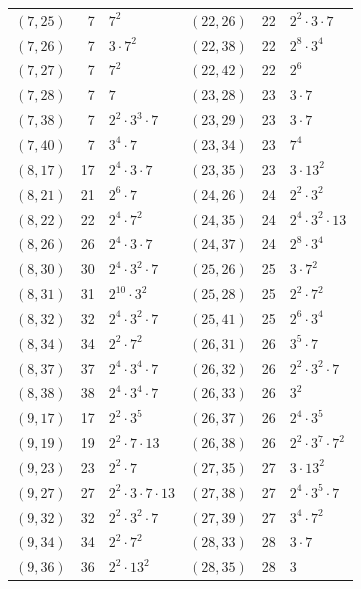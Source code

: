 \documentclass[11pt]{article}
\begin{document}
\begin{longtable}{@{}lrl@{\qquad}lrl@{}}
$(7,25)$ & 7 & $7^{2}$ & $(22,26)$ & 22 & $2^{2}\cdot 3\cdot 7$\\
$(7,26)$ & 7 & $3\cdot 7^{2}$ & $(22,38)$ & 22 & $2^{8}\cdot 3^{4}$\\
$(7,27)$ & 7 & $7^{2}$ & $(22,42)$ & 22 & $2^{6}$\\
$(7,28)$ & 7 & $7$ & $(23,28)$ & 23 & $3\cdot 7$\\
$(7,38)$ & 7 & $2^{2}\cdot 3^{3}\cdot 7$ & $(23,29)$ & 23 & $3\cdot 7$\\
$(7,40)$ & 7 & $3^{4}\cdot 7$ & $(23,34)$ & 23 & $7^{4}$\\
$(8,17)$ & 17 & $2^{4}\cdot 3\cdot 7$ & $(23,35)$ & 23 & $3\cdot 13^{2}$\\
$(8,21)$ & 21 & $2^{6}\cdot 7$ & $(24,26)$ & 24 & $2^{2}\cdot 3^{2}$\\
$(8,22)$ & 22 & $2^{4}\cdot 7^{2}$ & $(24,35)$ & 24 & $2^{4}\cdot 3^{2}\cdot 13$\\
$(8,26)$ & 26 & $2^{4}\cdot 3\cdot 7$ & $(24,37)$ & 24 & $2^{8}\cdot 3^{4}$\\
$(8,30)$ & 30 & $2^{4}\cdot 3^{2}\cdot 7$ & $(25,26)$ & 25 & $3\cdot 7^{2}$\\
$(8,31)$ & 31 & $2^{10}\cdot 3^{2}$ & $(25,28)$ & 25 & $2^{2}\cdot 7^{2}$\\
$(8,32)$ & 32 & $2^{4}\cdot 3^{2}\cdot 7$ & $(25,41)$ & 25 & $2^{6}\cdot 3^{4}$\\
$(8,34)$ & 34 & $2^{2}\cdot 7^{2}$ & $(26,31)$ & 26 & $3^{5}\cdot 7$\\
$(8,37)$ & 37 & $2^{4}\cdot 3^{4}\cdot 7$ & $(26,32)$ & 26 & $2^{2}\cdot 3^{2}\cdot 7$\\
$(8,38)$ & 38 & $2^{4}\cdot 3^{4}\cdot 7$ & $(26,33)$ & 26 & $3^{2}$\\
$(9,17)$ & 17 & $2^{2}\cdot 3^{5}$ & $(26,37)$ & 26 & $2^{4}\cdot 3^{5}$\\
$(9,19)$ & 19 & $2^{2}\cdot 7\cdot 13$ & $(26,38)$ & 26 & $2^{2}\cdot 3^{7}\cdot 7^{2}$\\
$(9,23)$ & 23 & $2^{2}\cdot 7$ & $(27,35)$ & 27 & $3\cdot 13^{2}$\\
$(9,27)$ & 27 & $2^{2}\cdot 3\cdot 7\cdot 13$ & $(27,38)$ & 27 & $2^{4}\cdot 3^{5}\cdot 7$\\
$(9,32)$ & 32 & $2^{2}\cdot 3^{2}\cdot 7$ & $(27,39)$ & 27 & $3^{4}\cdot 7^{2}$\\
$(9,34)$ & 34 & $2^{2}\cdot 7^{2}$ & $(28,33)$ & 28 & $3\cdot 7$\\
$(9,36)$ & 36 & $2^{2}\cdot 13^{2}$ & $(28,35)$ & 28 & $3$\\

\end{longtable}
\end{document}
